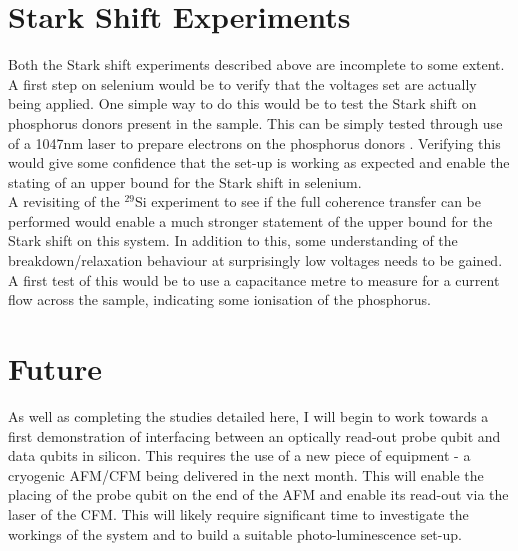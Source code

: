\section{Stark Shift Experiments}

Both the Stark shift experiments described above are incomplete to some extent. 
A first step on selenium would be to verify that the voltages set are actually being applied.
One simple way to do this would be to test the Stark shift on phosphorus donors present in the sample.
This can be simply tested through use of a 1047nm laser to prepare electrons on the phosphorus donors \cite{Nardo2015}.
Verifying this would give some confidence that the set-up is working as expected and enable the stating of an upper bound for the Stark shift in selenium.
\\
A revisiting of the $^{29}$Si experiment to see if the full coherence transfer can be performed would enable a much stronger statement of the upper bound for the Stark shift on this system.
In addition to this, some understanding of the breakdown/relaxation behaviour at surprisingly low voltages needs to be gained.
A first test of this would be to use a capacitance metre to measure for a current flow across the sample, indicating some ionisation of the phosphorus. 

\section{Future}

As well as completing the studies detailed here, I will begin to work towards a first demonstration of interfacing between an optically read-out probe qubit and data qubits in silicon.
This requires the use of a new piece of equipment - a cryogenic AFM/CFM being delivered in the next month.
This will enable the placing of the probe qubit on the end of the AFM and enable its read-out via the laser of the CFM.
This will likely require significant time to investigate the workings of the system and to build a suitable photo-luminescence set-up.
